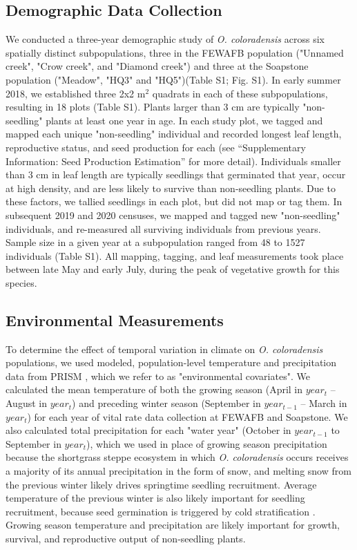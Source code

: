 \documentclass[12pt, letterpaper]{article}
\begin{document}
\subsection{Demographic Data Collection}
 We conducted a three-year demographic study of \textit{O. coloradensis} across six spatially distinct subpopulations, three in the FEWAFB population ("Unnamed creek", "Crow creek", and "Diamond creek") and three at the Soapstone population ("Meadow", "HQ3" and "HQ5")(Table S1; Fig. S1). In early summer 2018, we established three 2\textsf{x}2 m$^2$ quadrats in each of these subpopulations, resulting in 18 plots (Table S1). Plants larger than 3 cm are typically "non-seedling" plants at least one year in age. In each study plot, we tagged and mapped each unique "non-seedling" individual and recorded longest leaf length, reproductive status, and seed production for each (see “Supplementary Information: Seed Production Estimation” for more detail). Individuals smaller than 3 cm in leaf length are typically seedlings that germinated that year, occur at high density, and are less likely to survive than non-seedling plants. Due to these factors, we tallied seedlings in each plot, but did not map or tag them. In subsequent 2019 and 2020 censuses, we mapped and tagged new "non-seedling" individuals, and re-measured all surviving individuals from previous years. Sample size in a given year at a subpopulation ranged from 48 to 1527 individuals (Table S1). All mapping, tagging, and leaf measurements took place between late May and early July, during the peak of vegetative growth for this species. 

\subsection{Environmental Measurements}
To determine the effect of temporal variation in climate on \textit{O. coloradensis} populations, we used modeled, population-level temperature and precipitation data from PRISM \cite{PRISMClimateGroupOregonStateUniversity2021PRISMUniversity}, which we refer to as "environmental covariates". We calculated the mean temperature of both the growing season (April in  $year_t$ – August in $year_t$) and preceding winter season (September in $year_{t-1}$ – March in $year_{t}$) for each year of vital rate data collection at FEWAFB and Soapstone. We also calculated total precipitation for each "water year" (October in $year_{t-1}$ to September in $year_t$), which we used in place of growing season precipitation because the shortgrass steppe ecosystem in which \textit{O. coloradensis} occurs receives a majority of its annual precipitation in the form of snow, and melting snow from the previous winter likely drives springtime seedling recruitment. Average temperature of the previous winter is also likely important for seedling recruitment, because seed germination is triggered by cold stratification \cite{Burgess2005CapsuleColoradensis}. Growing season temperature and precipitation are likely important for growth, survival, and reproductive output of non-seedling plants. 
\end{document}
